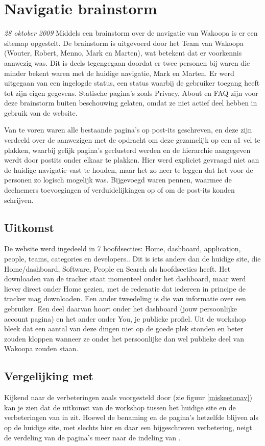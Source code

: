 \chapter{Navigatie brainstorm}
\textit{28 oktober 2009} Middels een brainstorm over de navigatie van Wakoopa is er een sitemap opgestelt. De brainstorm is uitgevoerd door het Team van Wakoopa (Wouter, Robert, Menno, Mark en Marten), wat betekent dat er voorkennis aanwezig was. Dit is deels tegengegaan doordat er twee personen bij waren die minder bekent waren met de huidige navigatie, Mark en Marten. Er werd uitgegaan van een ingelogde status, een status waarbij de gebruiker toegang heeft tot zijn eigen gegevens. Statische pagina's zoals Privacy, About en FAQ zijn voor deze brainstorm buiten beschouwing gelaten, omdat ze niet actief deel hebben in gebruik van de website.

Van te voren waren alle bestaande pagina's op post-its geschreven, en deze zijn verdeeld over de aanwezigen met de opdracht om deze gezamelijk op een a1 vel te plakken, waarbij gelijk pagina's geclusterd werden en de hierarchie aangegeven werdt door postits onder elkaar te plakken. Hier werd expliciet gevraagd niet aan de huidige navigatie vast te houden, maar het zo neer te leggen dat het voor de personen zo logisch mogelijk was. Bijgevoegd waren pennen, waarmee de deelnemers toevoegingen of verduidelijkingen op of om de post-its konden schrijven.

\section*{Uitkomst}
De website werd ingedeeld in 7 hoofdsecties: Home, dashboard, application, people, teams, categories en developers.. Dit is iets anders dan de huidige site, die Home/dashboard, Software, People en Search als hoofdsecties heeft. Het downloaden van de tracker staat momenteel onder het dashboard, maar werd liever direct onder Home gezien, met de redenatie dat iedereen in principe de tracker mag downloaden. Een ander tweedeling is die van informatie over een gebruiker. Een deel daarvan hoort onder het dashboard (jouw persoonlijke account pagina) en het ander onder You, je publieke profiel. Uit de workshop bleek dat een aantal van deze dingen niet op de goede plek stonden en beter zouden kloppen wanneer ze onder het persoonlijke dan wel publieke deel van Wakoopa zouden staan.
\section*{Vergelijking met \citeauthor{Hoekman2008}}
Kijkend naar de verbeteringen zoals voorgesteld door \citeauthor{Hoekman2008} (zie figuur \ref{miskeetonav}) kan je zien dat de uitkomst van de workshop tussen het huidige site en de verbeteringen van \citeauthor{Hoekman2008} in zit. Hoewel de benaming en de pagina's hetzelfde blijven als op de huidige site, met slechts hier en daar een bijgeschreven verbetering, neigt de verdeling van de pagina's meer naar de indeling van \citeauthor{Hoekman2008}.

